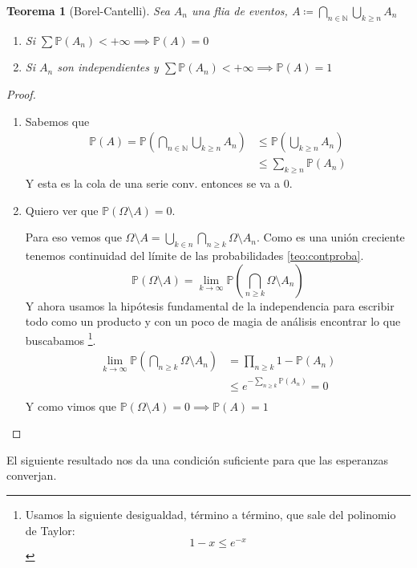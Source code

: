 \documentclass[11pt]{article}
\theoremstyle{plain} %
\newtheorem{teorema}{\color{rojo}Teorema}
\theoremstyle{definition}
\theoremstyle{remark}
\def\Om{\Omega}
\def\N{\mathbb{N}}
\def\P{\mathbb{P}}
\begin{document}
\begin{teorema}
	[Borel-Cantelli]
	Sea $A_n$ una flia de eventos, $A \coloneqq \bigcap_{n \in \N} \bigcup_{k \geq n} A_n$
	\begin{enumerate}
		\item Si $\sum \P (A_n) < + \infty \implies \P(A)=0$ 
		\item Si $A_n$ son independientes y $\sum \P (A_n) < + \infty \implies \P(A)=1$ 
	\end{enumerate}	
\end{teorema}

\begin{proof}
	\begin{enumerate}
		Ambas demostraciones son directas salvo la segunda que requiere un poco de ingenio al final.
		\item Sabemos que 
		\begin{align*}
			\P (A) = \P (\bigcap_{n \in \N} \bigcup_{k \geq n} A_n) &\leq \P(\bigcup_{k \geq n} A_n) \\
			&\leq \sum_{k \geq n} \P(A_n)
		\end{align*}
Y esta es la cola de una serie conv. entonces se va a 0.

		\item Quiero ver que $\P(\Om \setminus A) = 0$.
		
		Para eso vemos que $\Om \setminus A =  \bigcup_{k \in n} \bigcap_{n \geq k} \Om \setminus A_n$. Como es una unión creciente tenemos continuidad del límite de las probabilidades \ref{teo:contproba}.
		\[ \P\left( \Om \setminus A \right)  = \lim_{k \to \infty} \P (\bigcap_{n \geq k} \Om \setminus A_n)  \]
		Y ahora usamos la hipótesis fundamental de la independencia para escribir todo como un producto y con un poco de magia de análisis encontrar lo que buscabamos \footnote{Usamos la siguiente desigualdad, término a término, que sale del polinomio de Taylor: $$1-x \leq e^{-x}$$}.
		\begin{align*}
			\lim_{k \to \infty} \P (\bigcap_{n \geq k} \Om \setminus A_n) &=\prod_{n \geq k} 1 - \P(A_n) \\
			& \leq e^{-\sum_{n \geq k} \P(A_n)}  = 0 \\
		\end{align*}
		Y como vimos que $\P(\Om \setminus A) = 0 \implies \P(A)=1$  
	\end{enumerate}
\end{proof}

El siguiente resultado nos da una  condición suficiente para que las esperanzas converjan.
\end{document}

